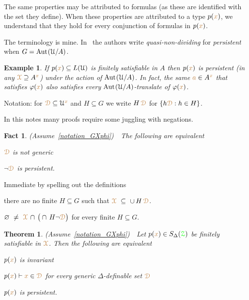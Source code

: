 \documentclass[10pt,openany]{amsproc}
\makeatletter
\newcommand{\mylabel}[1]{{\ssf{#1}}\hfill}
\renewenvironment{itemize}
  {\begin{list}{}{%
   \setlength{\parskip}{0mm}
   \setlength{\topsep}{.2\baselineskip}
   \setlength{\rightmargin}{0mm}
   \setlength{\listparindent}{0mm}
   \setlength{\itemindent}{0mm}
   \setlength{\labelwidth}{2ex}
   \setlength{\itemsep}{.1\baselineskip}
   \setlength{\parsep}{0mm}
   \setlength{\partopsep}{0mm}
   \setlength{\labelsep}{1ex}
   \setlength{\leftmargin}{\labelwidth+\labelsep}
   \let\makelabel\mylabel
   }}
   {\vspace*{-.3\baselineskip}\end{list}}
\def\proves{\vdash}
\def\Aut{{\rm Aut\kern.15ex}}
\def\D{\EuScript D}
\def\X{\EuScript X}
\def\Z{\EuScript Z}
\def\U{\EuScript U}
\def\0{\varnothing}
\def\phi{\varphi}
\def\ssf#1{\textsf{\small #1}}
\newcounter{thm}
\theoremstyle{mio}
\newtheorem{theorem}[thm]{Theorem}\tcolorboxenvironment{theorem}{mythm}
\newtheorem{fact}[thm]{Fact}\tcolorboxenvironment{fact}{mythm}
\newtheorem{example}[thm]{Example}\tcolorboxenvironment{example}{mythm}
\providecommand{\proofNameStyle}{\bfseries}
\renewenvironment{proof}[1][\proofname]{\par
  \pushQED{\qed}%
  \normalfont%
  \trivlist
  \item[\hskip\labelsep
        \proofNameStyle
    #1\@addpunct{.}]\ignorespaces
}{%
  \popQED\endtrivlist\@endpefalse
}
\def\mr{\color{brown}}
\def\gr{\color{green}}
\def\mrD{{\mr\D}}
\def\mrX{{\mr\X}}
\def\grZ{{\gr\Z}}
\makeatother
\begin{document}
The same properties may be attributed to formulas (as these are identified with the set they define).
When these properties are attributed to a type $p({\mr x})$, we understand that they hold for every conjunction of formulas in $p({\mr x})$.

The terminology is mine.
In~\cite{CK} the authors write \textit{quasi-non-dividing\/} for \textit{persistent\/} when $G=\Aut(\U/A)$.

\begin{example}
  If $p({\mr x})\subseteq L(\U)$ is finitely satisfiable in $A$ then $p({\mr x})$ is persistent (in any $\mrX\supseteq A^{\mr x}$) under the action of $\Aut(\U/A)$.
  In fact, the same ${\mr a}\in A^{\mr x}$ that satisfies $\phi({\mr x})$ also satisfies every $\Aut(\U/A)$-translate of $\phi({\mr x})$.
\end{example}

Notation: for $\mrD\subseteq\U^{\mr x}$ and $H\subseteq G$ we write $H\,\mrD$ for $\{h\mrD: h\in H\}$.

In this notes many proofs require some juggling with negations.

\begin{fact}\label{fact_fip}
  (Assume~\ref{notation_GXphi})\ \  
  The following are equivalent
  \begin{itemize}
    \item[1.] $\mrD$ is not generic
    \item[2.] $\neg\mrD$ is persistent.
  \end{itemize}
\end{fact}

\begin{proof}
  Immediate by spelling out the definitions\smallskip
  \begin{itemize}
    \item[1.] there are no finite $H\subseteq G$ such that $\mrX\ \subseteq\ \cup\, H\,{\mr\D}$.
    \item[2.]  $\0\ \neq\ \mrX\,\cap\,\big(\cap\, H\neg{\mr\D}\big)$ for every finite $H\subseteq G$.\qedhere
  \end{itemize} 
\end{proof}

\begin{theorem}\label{thm_generic_invariant}
  (Assume~\ref{notation_GXphi})\ \  
  Let $p({\mr x})\in S_\Delta(\grZ)$ be finitely satisfiable in $\mrX$.
  Then the following are equivalent
  \begin{itemize}
    \item[1.] $p({\mr x})$ is invariant
    \item[2.] $p({\mr x})\proves{\mr x}\in\mrD$ for every generic $\Delta$-definable set $\mrD$
    \item[3.] $p({\mr x})$ is persistent.
  \end{itemize}
\end{theorem}
\end{document}

